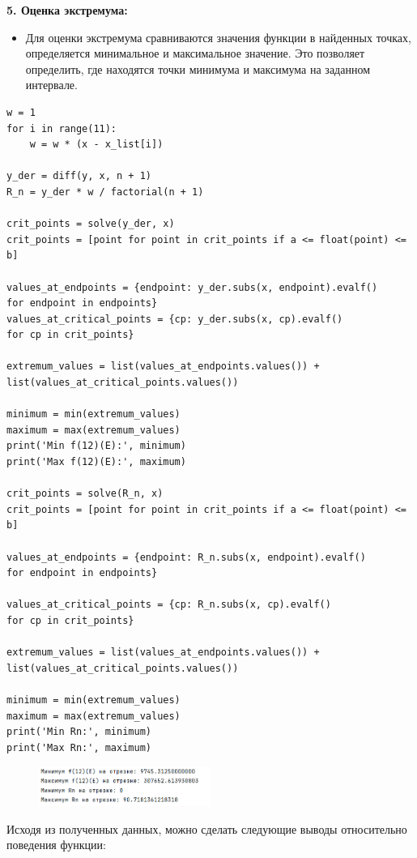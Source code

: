 \documentclass{article}
\begin{document}
\begin{itemize}
\textbf{5. Оценка экстремума:}
\begin{itemize}
    \item Для оценки экстремума сравниваются значения функции в найденных точках, определяется минимальное и максимальное значение. Это позволяет определить, где находятся точки минимума и максимума на заданном интервале.
\end{itemize}


\begin{lstlisting}
w = 1
for i in range(11):
    w = w * (x - x_list[i])

y_der = diff(y, x, n + 1)
R_n = y_der * w / factorial(n + 1)

crit_points = solve(y_der, x)
crit_points = [point for point in crit_points if a <= float(point) <= b]

values_at_endpoints = {endpoint: y_der.subs(x, endpoint).evalf()
for endpoint in endpoints}
values_at_critical_points = {cp: y_der.subs(x, cp).evalf()
for cp in crit_points}

extremum_values = list(values_at_endpoints.values()) + 
list(values_at_critical_points.values())

minimum = min(extremum_values)
maximum = max(extremum_values)
print('Min f(12)(E):', minimum)
print('Max f(12)(E):', maximum)

crit_points = solve(R_n, x)
crit_points = [point for point in crit_points if a <= float(point) <= b]

values_at_endpoints = {endpoint: R_n.subs(x, endpoint).evalf()
for endpoint in endpoints}

values_at_critical_points = {cp: R_n.subs(x, cp).evalf()
for cp in crit_points}

extremum_values = list(values_at_endpoints.values()) +
list(values_at_critical_points.values())

minimum = min(extremum_values)
maximum = max(extremum_values)
print('Min Rn:', minimum)
print('Max Rn:', maximum)
\end{lstlisting}

\begin{figure}[h]
    \centering
    \includegraphics[width=0.5\textwidth]{lab_2_3.png}
    \label{fig:my_label}
\end{figure}

Исходя из полученных данных, можно сделать следующие выводы относительно поведения функции:


\end{itemize}
\end{document}
